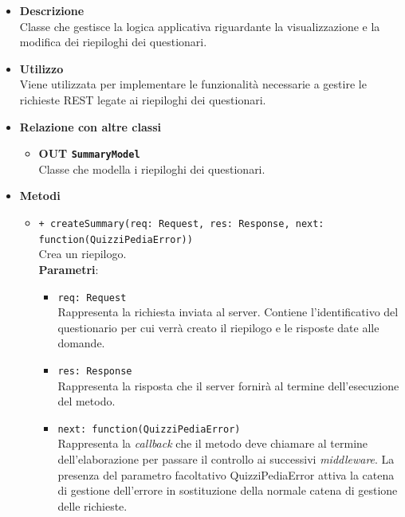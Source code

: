 \begin{itemize}
	\item \textbf{Descrizione} \\
	Classe che gestisce la logica applicativa riguardante la visualizzazione e la modifica dei riepiloghi dei questionari.
	\item \textbf{Utilizzo} \\
	Viene utilizzata per implementare le funzionalità necessarie a gestire le richieste REST legate ai riepiloghi dei questionari.
	\item \textbf{Relazione con altre classi}\\
	\begin{itemize}
			\item \textbf{OUT \texttt{SummaryModel}} \\
			Classe che modella i riepiloghi dei questionari.
	\end{itemize}
	\item \textbf{Metodi}\\
	\begin{itemize}
		\item \texttt{+ createSummary(req: Request, res: Response, next: function(QuizziPediaError))}\\
		Crea un riepilogo.\\
		\textbf{Parametri}:
		\begin{itemize}
			\item \texttt{req: Request}\\
			Rappresenta la richiesta inviata al server. Contiene l'identificativo del questionario per cui verrà creato il riepilogo e le risposte date alle domande.
			\item \texttt{res: Response}\\
			Rappresenta la risposta che il server fornirà al termine dell'esecuzione del metodo.
			\item \texttt{next: function(QuizziPediaError)}\\
			Rappresenta la \textit{callback} che il metodo deve chiamare al termine dell'elaborazione per passare il controllo ai successivi \textit{middleware}. La presenza del parametro facoltativo QuizziPediaError attiva la catena di gestione dell'errore in sostituzione della normale catena di gestione delle richieste.
		\end{itemize}
	\end{itemize}
\end{itemize}